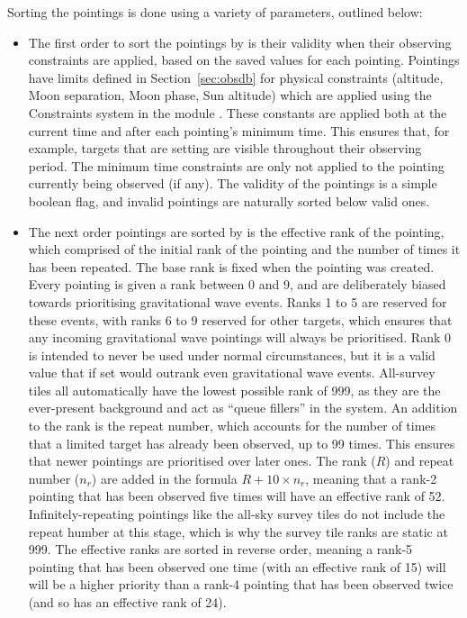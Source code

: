 \begin{colsection}
\begin{colsection}
Sorting the pointings is done using a variety of parameters, outlined below:

\begin{itemize}
\item The first order to sort the pointings by is their validity when their observing constraints are applied, based on the saved values for each pointing. Pointings have limits defined in Section~\ref{sec:obsdb} for physical constraints (altitude, Moon separation, Moon phase, Sun altitude) which are applied using the Constraints system in the   module \citep{astroplan}. These constants are applied both at the current time and after each pointing's minimum time. This ensures that, for example, targets that are setting are visible throughout their observing period. The minimum time constraints are only not applied to the pointing currently being observed (if any). The validity of the pointings is a simple boolean flag, and invalid pointings are naturally sorted below valid ones.

\item The next order pointings are sorted by is the effective rank of the pointing, which comprised of the initial rank of the pointing and the number of times it has been repeated. The base rank is fixed when the pointing was created. Every pointing is given a rank between 0 and 9, and are deliberately biased towards prioritising gravitational wave events. Ranks 1 to 5 are reserved for these events, with ranks 6 to 9 reserved for other targets, which ensures that any incoming gravitational wave pointings will always be prioritised. Rank 0 is intended to never be used under normal circumstances, but it is a valid value that if set would outrank even gravitational wave events. All-survey tiles all automatically have the lowest possible rank of 999, as they are the ever-present background and act as ``queue fillers'' in the system. An addition to the rank is the repeat number, which accounts for the number of times that a limited target has already been observed, up to 99 times. This ensures that newer pointings are prioritised over later ones. The rank ($R$) and repeat number ($n_r$) are added in the formula $R + 10\times n_r$, meaning that a rank-2 pointing that has been observed five times will have an effective rank of 52. Infinitely-repeating pointings like the all-sky survey tiles do not include the repeat humber at this stage, which is why the survey tile ranks are static at 999. The effective ranks are sorted in reverse order, meaning a rank-5 pointing that has been observed one time (with an effective rank of 15) will will be a higher priority than a rank-4 pointing that has been observed twice (and so has an effective rank of 24).


\end{itemize}
\end{colsection}
\end{colsection}
